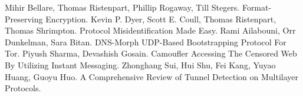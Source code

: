 \newpage

\begin{thebibliography}{9}
\bibitem {} Mihir Bellare, Thomas Ristenpart, Phillip Rogaway, Till Stegers. Format-Preserving Encryption.
\bibitem {} Kevin P. Dyer, Scott E. Coull, Thomas Ristenpart, Thomas Shrimpton. Protocol Misidentification Made Easy.
\bibitem {} Rami Ailabouni, Orr Dunkelman, Sara Bitan. DNS-Morph UDP-Based Bootstrapping Protocol For Tor.
\bibitem {} Piyush Sharma, Devashish Gosain. Camoufler Accessing The Censored Web By Utilizing Instant Messaging.
\bibitem {} Zhonghang Sui, Hui Shu, Fei Kang, Yuyao Huang, Guoyu Huo. A Comprehensive Review of Tunnel Detection on Multilayer Protocols.
\end{thebibliography}



